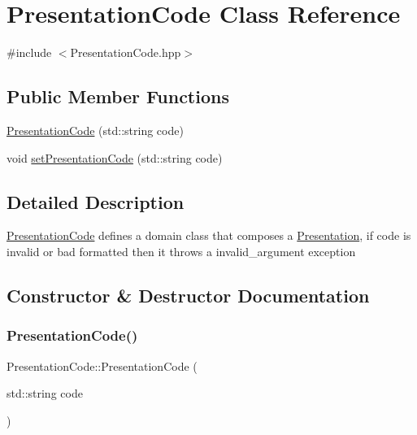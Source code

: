 \hypertarget{class_presentation_code}{}\section{Presentation\+Code Class Reference}
\label{class_presentation_code}


{\ttfamily \#include $<$Presentation\+Code.\+hpp$>$}

\subsection*{Public Member Functions}
\begin{DoxyCompactItemize}
\item 
\mbox{\hyperlink{class_presentation_code_a39d8d77f0a460307e5e665fcd0ed6e5b}{Presentation\+Code}} (std\+::string code)
\item 
void \mbox{\hyperlink{class_presentation_code_a85bfe04587ad392b60cef5bfe7057592}{set\+Presentation\+Code}} (std\+::string code)
\end{DoxyCompactItemize}


\subsection{Detailed Description}
\mbox{\hyperlink{class_presentation_code}{Presentation\+Code}} defines a domain class that composes a \mbox{\hyperlink{class_presentation}{Presentation}}, if code is invalid or bad formatted then it throws a invalid\+\_\+argument exception 

\subsection{Constructor \& Destructor Documentation}
\mbox{\label{class_presentation_code_a39d8d77f0a460307e5e665fcd0ed6e5b}} 
\subsubsection{\texorpdfstring{PresentationCode()}{PresentationCode()}}
{\footnotesize\ttfamily Presentation\+Code\+::\+Presentation\+Code (\begin{DoxyParamCaption}\item[{std\+::string}]{code }\end{DoxyParamCaption})}



